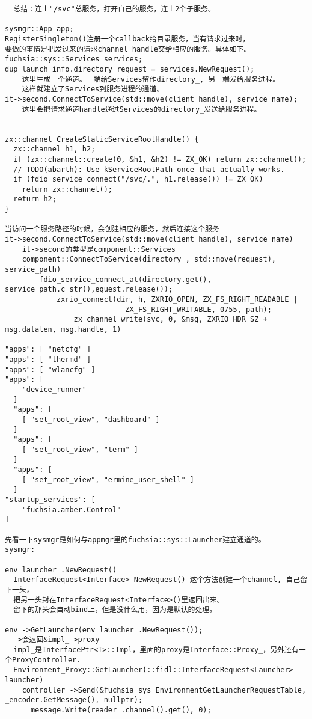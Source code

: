 \begin{verbatim}
  总结：连上"/svc"总服务，打开自己的服务，连上2个子服务。

sysmgr::App app;
RegisterSingleton()注册一个callback给目录服务，当有请求过来时，
要做的事情是把发过来的请求channel handle交给相应的服务。具体如下。
fuchsia::sys::Services services;
dup_launch_info.directory_request = services.NewRequest();
    这里生成一个通道。一端给Services留作directory_, 另一端发给服务进程。
    这样就建立了Services到服务进程的通道。
it->second.ConnectToService(std::move(client_handle), service_name);
    这里会把请求通道handle通过Services的directory_发送给服务进程。


zx::channel CreateStaticServiceRootHandle() {
  zx::channel h1, h2;
  if (zx::channel::create(0, &h1, &h2) != ZX_OK) return zx::channel();
  // TODO(abarth): Use kServiceRootPath once that actually works.
  if (fdio_service_connect("/svc/.", h1.release()) != ZX_OK)
    return zx::channel();
  return h2;
}

当访问一个服务路径的时候，会创建相应的服务，然后连接这个服务
it->second.ConnectToService(std::move(client_handle), service_name)
    it->second的类型是component::Services
    component::ConnectToService(directory_, std::move(request), service_path)
        fdio_service_connect_at(directory.get(), service_path.c_str(),equest.release());
            zxrio_connect(dir, h, ZXRIO_OPEN, ZX_FS_RIGHT_READABLE |
                            ZX_FS_RIGHT_WRITABLE, 0755, path);
                zx_channel_write(svc, 0, &msg, ZXRIO_HDR_SZ + msg.datalen, msg.handle, 1)

"apps": [ "netcfg" ]
"apps": [ "thermd" ]
"apps": [ "wlancfg" ]
"apps": [
    "device_runner"
  ]
  "apps": [
    [ "set_root_view", "dashboard" ]
  ]
  "apps": [
    [ "set_root_view", "term" ]
  ]
  "apps": [
    [ "set_root_view", "ermine_user_shell" ]
  ]
"startup_services": [
    "fuchsia.amber.Control"
]

先看一下sysmgr是如何与appmgr里的fuchsia::sys::Launcher建立通道的。
sysmgr:

env_launcher_.NewRequest()
  InterfaceRequest<Interface> NewRequest() 这个方法创建一个channel, 自己留下一头，
  把另一头封在InterfaceRequest<Interface>()里返回出来。
  留下的那头会自动bind上，但是没什么用，因为是默认的处理。

env_->GetLauncher(env_launcher_.NewRequest());
  ->会返回&impl_->proxy
  impl_是InterfacePtr<T>::Impl，里面的proxy是Interface::Proxy_，另外还有一个ProxyController.
  Environment_Proxy::GetLauncher(::fidl::InterfaceRequest<Launcher> launcher)
    controller_->Send(&fuchsia_sys_EnvironmentGetLauncherRequestTable, _encoder.GetMessage(), nullptr);
      message.Write(reader_.channel().get(), 0);


\end{verbatim}
